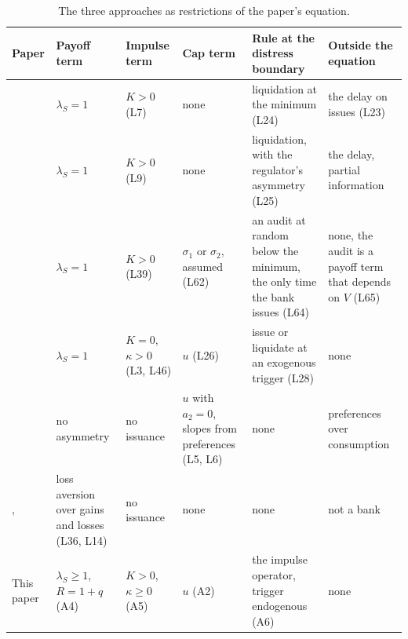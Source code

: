 \begin{table}[H]
\footnotesize
\caption{The three approaches as restrictions of the paper's equation.}\label{tab:common}
\begin{tabular}{@{}P{2.8cm}P{2.9cm}P{2.4cm}P{1.9cm}P{2.1cm}P{2.7cm}@{}}
\toprule
Paper & Payoff term & Impulse term & Cap term & Rule at the distress boundary & Outside the equation \\
\midrule
\citet{peura2006} & $\lambda_S=1$ & $K>0$ (L7) & none & liquidation at the minimum (L24) & the delay on issues (L23) \\ \addlinespace
\citet{daihuangkeppo2019} & $\lambda_S=1$ & $K>0$ (L9) & none & liquidation, with the regulator's asymmetry (L25) & the delay, partial information \\ \addlinespace
\citet{milnewhalley2001} & $\lambda_S=1$ & $K>0$ (L39) & $\sigma_1$ or $\sigma_2$, assumed (L62) & an audit at random below the minimum, the only time the bank issues (L64) & none, the audit is a payoff term that depends on $V$ (L65) \\ \addlinespace
\citet{bayraktar2026} & $\lambda_S=1$ & $K=0$, $\kappa>0$ (L3, L46) & $u$ (L26) & issue or liquidate at an exogenous trigger (L28) & none \\ \addlinespace
\citet{blackperold1992} & no asymmetry & no issuance & $u$ with $a_2=0$, slopes from preferences (L5, L6) & none & preferences over consumption \\ \addlinespace
\citet{barberis2001}, \citet{li2023} & loss aversion over gains and losses (L36, L14) & no issuance & none & none & not a bank \\ \addlinespace
This paper & $\lambda_S\ge1$, $R=1+q$ (A4) & $K>0$, $\kappa\ge0$ (A5) & $u$ (A2) & the impulse operator, trigger endogenous (A6) & none \\
\bottomrule
\end{tabular}
\end{table}

